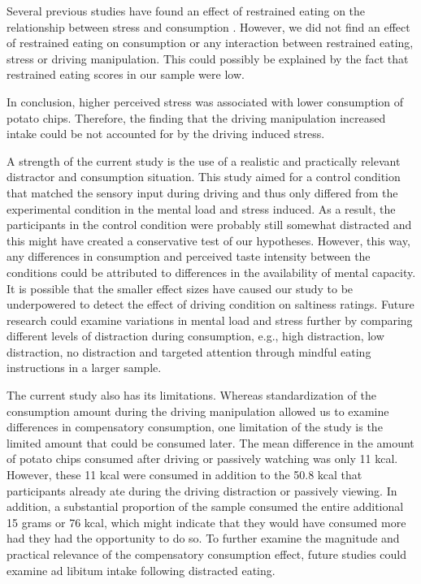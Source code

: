 \documentclass[authordate, empirical]{jote-new-article}
\begin{document}
Several previous studies have found an effect of restrained eating on the relationship between stress and consumption \parencites{Wallis2004}{Wallis2009}. However, we did not find an effect of restrained eating on consumption or any interaction between restrained eating, stress or driving manipulation. This could possibly be explained by the fact that restrained eating scores in our sample were low.



In conclusion, higher perceived stress was associated with lower consumption of potato chips. Therefore, the finding that the driving manipulation increased intake could be not accounted for by the driving induced stress.



A strength of the current study is the use of a realistic and practically relevant distractor and consumption situation. This study aimed for a control condition that matched the sensory input during driving and thus only differed from the experimental condition in the mental load and stress induced. As a result, the participants in the control condition were probably still somewhat distracted and this might have created a conservative test of our hypotheses. However, this way, any differences in consumption and perceived taste intensity between the conditions could be attributed to differences in the availability of mental capacity. It is possible that the smaller effect sizes have caused our study to be underpowered to detect the effect of driving condition on saltiness ratings. Future research could examine variations in mental load and stress further by comparing different levels of distraction during consumption, e.g., high distraction, low distraction, no distraction and targeted attention through mindful eating instructions in a larger sample.



The current study also has its limitations. Whereas standardization of the consumption amount during the driving manipulation allowed us to examine differences in compensatory consumption, one limitation of the study is the limited amount that could be consumed later. The mean difference in the amount of potato chips consumed after driving or passively watching was only 11 kcal. However, these 11 kcal were consumed in addition to the 50.8 kcal that participants already ate during the driving distraction or passively viewing. In addition, a substantial proportion of the sample consumed the entire additional 15 grams or 76 kcal, which might indicate that they would have consumed more had they had the opportunity to do so. To further examine the magnitude and practical relevance of the compensatory consumption effect, future studies could examine ad libitum intake following distracted eating.
\end{document}
